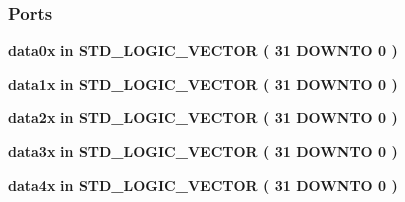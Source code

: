 \subsubsection*{Ports}
 \begin{DoxyCompactItemize}
\item 
{\bf data0x}  {\bfseries {\bfseries \textcolor{keywordflow}{in}\textcolor{vhdlchar}{ }}} {\bfseries \textcolor{comment}{S\+T\+D\+\_\+\+L\+O\+G\+I\+C\+\_\+\+V\+E\+C\+T\+OR}\textcolor{vhdlchar}{ }\textcolor{vhdlchar}{(}\textcolor{vhdlchar}{ }\textcolor{vhdlchar}{ } \textcolor{vhdldigit}{31} \textcolor{vhdlchar}{ }\textcolor{keywordflow}{D\+O\+W\+N\+TO}\textcolor{vhdlchar}{ }\textcolor{vhdlchar}{ } \textcolor{vhdldigit}{0} \textcolor{vhdlchar}{ }\textcolor{vhdlchar}{)}\textcolor{vhdlchar}{ }} 
\item 
{\bf data1x}  {\bfseries {\bfseries \textcolor{keywordflow}{in}\textcolor{vhdlchar}{ }}} {\bfseries \textcolor{comment}{S\+T\+D\+\_\+\+L\+O\+G\+I\+C\+\_\+\+V\+E\+C\+T\+OR}\textcolor{vhdlchar}{ }\textcolor{vhdlchar}{(}\textcolor{vhdlchar}{ }\textcolor{vhdlchar}{ } \textcolor{vhdldigit}{31} \textcolor{vhdlchar}{ }\textcolor{keywordflow}{D\+O\+W\+N\+TO}\textcolor{vhdlchar}{ }\textcolor{vhdlchar}{ } \textcolor{vhdldigit}{0} \textcolor{vhdlchar}{ }\textcolor{vhdlchar}{)}\textcolor{vhdlchar}{ }} 
\item 
{\bf data2x}  {\bfseries {\bfseries \textcolor{keywordflow}{in}\textcolor{vhdlchar}{ }}} {\bfseries \textcolor{comment}{S\+T\+D\+\_\+\+L\+O\+G\+I\+C\+\_\+\+V\+E\+C\+T\+OR}\textcolor{vhdlchar}{ }\textcolor{vhdlchar}{(}\textcolor{vhdlchar}{ }\textcolor{vhdlchar}{ } \textcolor{vhdldigit}{31} \textcolor{vhdlchar}{ }\textcolor{keywordflow}{D\+O\+W\+N\+TO}\textcolor{vhdlchar}{ }\textcolor{vhdlchar}{ } \textcolor{vhdldigit}{0} \textcolor{vhdlchar}{ }\textcolor{vhdlchar}{)}\textcolor{vhdlchar}{ }} 
\item 
{\bf data3x}  {\bfseries {\bfseries \textcolor{keywordflow}{in}\textcolor{vhdlchar}{ }}} {\bfseries \textcolor{comment}{S\+T\+D\+\_\+\+L\+O\+G\+I\+C\+\_\+\+V\+E\+C\+T\+OR}\textcolor{vhdlchar}{ }\textcolor{vhdlchar}{(}\textcolor{vhdlchar}{ }\textcolor{vhdlchar}{ } \textcolor{vhdldigit}{31} \textcolor{vhdlchar}{ }\textcolor{keywordflow}{D\+O\+W\+N\+TO}\textcolor{vhdlchar}{ }\textcolor{vhdlchar}{ } \textcolor{vhdldigit}{0} \textcolor{vhdlchar}{ }\textcolor{vhdlchar}{)}\textcolor{vhdlchar}{ }} 
\item 
{\bf data4x}  {\bfseries {\bfseries \textcolor{keywordflow}{in}\textcolor{vhdlchar}{ }}} {\bfseries \textcolor{comment}{S\+T\+D\+\_\+\+L\+O\+G\+I\+C\+\_\+\+V\+E\+C\+T\+OR}\textcolor{vhdlchar}{ }\textcolor{vhdlchar}{(}\textcolor{vhdlchar}{ }\textcolor{vhdlchar}{ } \textcolor{vhdldigit}{31} \textcolor{vhdlchar}{ }\textcolor{keywordflow}{D\+O\+W\+N\+TO}\textcolor{vhdlchar}{ }\textcolor{vhdlchar}{ } \textcolor{vhdldigit}{0} \textcolor{vhdlchar}{ }\textcolor{vhdlchar}{)}\textcolor{vhdlchar}{ }} 

\end{DoxyCompactItemize}
